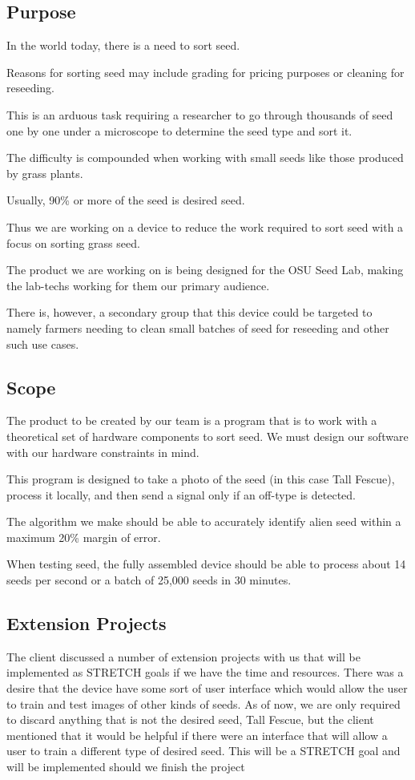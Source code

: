 \documentclass[onecolumn, draftclsnofoot,10pt, compsoc]{IEEEtran}
\begin{document}
	\subsection{Purpose}
	
	In the world today, there is a need to sort seed.
	
	Reasons for sorting seed may include grading for pricing purposes or cleaning for reseeding. 
	
	This is an arduous task requiring a researcher to go through thousands of seed one by one under a microscope to determine the seed type and sort it.
	
	The difficulty is compounded when working with small seeds like those produced by grass plants.
	
	Usually, 90\% or more of the seed is desired seed.
	
	Thus we are working on a device to reduce the work required to sort seed with a focus on sorting grass seed.
	
	The product we are working on is being designed for the OSU Seed Lab, making the lab-techs working for them our primary audience.
	
	There is, however, a secondary group that this device could be targeted to namely farmers needing to clean small batches of seed for reseeding and other such use cases.
	
	
	
	\subsection{Scope}
	
	The product to be created by our team is a program that is to work with a theoretical set of hardware components to sort seed. We must design our software with our hardware constraints in mind. 
	
	This program is designed to take a photo of the seed (in this case Tall Fescue), process it locally, and then send a signal only if an off-type is detected.
	
	The algorithm we make should be able to accurately identify alien seed within a maximum 20\% margin of error.
	
	When testing seed, the fully assembled device should be able to process about 14 seeds per second or a batch of 25,000 seeds in 30 minutes. 
	
	\subsection{Extension Projects}
	The client discussed a number of extension projects with us that will be implemented as STRETCH goals if we have the time and resources. There was a desire that the device have some sort of user interface which would allow the user to train and test images of other kinds of seeds. As of now, we are only required to discard anything that is not the desired seed, Tall Fescue, but the client mentioned that it would be helpful if there were an interface that will allow a user to train a different type of desired seed. This will be a STRETCH goal and will be implemented should we finish the project
	
\end{document}
